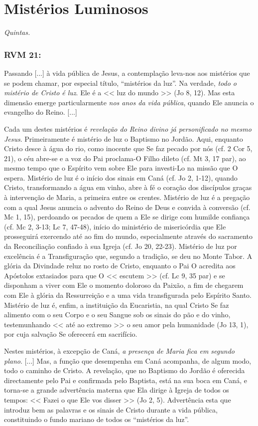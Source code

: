 \documentclass[10pt,a5paper]{book}
\newcommand{\from}[1]{\subsection*{#1}}
\begin{document}

\chapter{Mistérios Luminosos}

\emph{Quintas.}

\from{RVM 21:}

Passando [...] à vida pública de Jesus, a contemplação leva-nos aos mistérios que se podem chamar, por especial título, “mistérios da luz”. Na verdade, \emph{todo o mistério de Cristo é luz}.
Ele é a << luz do mundo >> (Jo 8, 12).
Mas esta dimensão emerge particularmente \emph{nos anos da vida pública}, quando Ele anuncia o evangelho do Reino. [...]

Cada um destes mistérios é \emph{revelação do Reino divino já personificado no mesmo Jesus}.
Primeiramente é mistério de luz o Baptismo no Jordão.
Aqui, enquanto Cristo desce à água do rio, como inocente que Se faz pecado por nós (cf. 2 Cor 5, 21), o céu abre-se e a voz do Pai proclama-O Filho dileto (cf. Mt 3, 17 par), ao mesmo tempo que o Espírito vem sobre Ele para
investi-Lo na missão que O espera.
Mistério de luz é o início dos sinais em Caná (cf. Jo 2, 1-12), quando Cristo, transformando a água em vinho, abre à fé o coração dos discípulos graças à intervenção de Maria, a primeira entre os crentes.
Mistério de luz é a pregação com a qual Jesus anuncia o advento do Reino de Deus e convida à conversão (cf. Mc 1, 15), perdoando os pecados de quem a Ele se dirige com humilde confiança (cf. Mc 2, 3-13; Lc 7, 47-48), início do ministério de misericórdia que Ele prosseguirá exercendo até ao fim do mundo, especialmente através do
sacramento da Reconciliação confiado à sua Igreja (cf. Jo 20, 22-23).
Mistério de luz por excelência é a Transfiguração que, segundo a tradição, se deu no Monte Tabor.
A glória da Divindade reluz no rosto de Cristo, enquanto o Pai O acredita aos Apóstolos extasiados para que O << escutem >> (cf. Lc 9, 35 par) e se disponham a viver com Ele o momento doloroso da Paixão, a fim de chegarem com Ele à glória da Ressurreição e a uma vida transfigurada pelo Espírito Santo.
Mistério de luz é, enfim, a instituição da Eucaristia, na qual Cristo Se faz alimento com o seu Corpo e o seu Sangue sob os sinais do pão e do vinho, testemunhando << até ao extremo >> o seu amor pela humanidade (Jo 13, 1), por cuja salvação Se oferecerá em sacrifício.

Nestes mistérios, à excepção de Caná, \emph{a presença de Maria fica em segundo plano}.
[...]
Mas, a função que desempenha em Caná acompanha, de algum modo, todo o caminho de Cristo.
A revelação, que no Baptismo do Jordão é oferecida directamente pelo Pai e confirmada pelo Baptista, está na sua boca em Caná, e torna-se a grande advertência materna que Ela dirige à Igreja de todos os tempos:
<< Fazei o que Ele vos disser >> (Jo 2, 5).
Advertência esta que introduz bem as palavras e os sinais de Cristo durante a vida pública, constituindo o fundo mariano de todos os ``mistérios da luz''.
\end{document}

